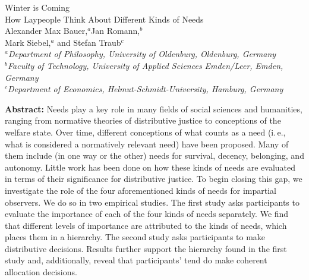 \documentclass[egregdoesnotlikesansseriftitles]{scrartcl}
\begin{document}
\thispagestyle{empty}
\renewcommand{\thefootnote}{\fnsymbol{footnote}}
\begin{center}
   {\LARGE Winter is Coming}\\\vspace{2ex}
   {\Large How Laypeople Think About Different Kinds of Needs}\\\vspace{4ex}
   {\large Alexander Max Bauer,$^{a}$\footnotemark[1] Jan Romann,$^{b}$\\ Mark Siebel,$^a$ and Stefan Traub$^c$}\\\vspace{2ex}
   \textsl{\footnotesize $^{a}$Department of Philosophy, University of Oldenburg, Oldenburg, Germany}\\\vspace{0.5ex}
   \textsl{\footnotesize $^{b}$Faculty of Technology, University of Applied Sciences Emden/Leer, Emden, Germany}\\\vspace{0.5ex}
   \textsl{\footnotesize $^{c}$Department of Economics, Helmut-Schmidt-University, Hamburg, Germany}\\\vspace{2ex}
\end{center}

\vspace{\fill}\noindent\textbf{Abstract:} Needs play a key role in many fields of social sciences and humanities, ranging from normative theories of distributive justice to conceptions of the welfare state.
Over time, different conceptions of what counts as a need (i.\,e., what is considered a normatively relevant need) have been proposed.
Many of them include (in one way or the other) needs for survival, decency, belonging, and autonomy.
Little work has been done on how these kinds of needs are evaluated in terms of their significance for distributive justice.
To begin closing this gap, we investigate the role of the four aforementioned kinds of needs for impartial observers.
We do so in two empirical studies.
The first study asks participants to evaluate the importance of each of the four kinds of needs separately.
We find that different levels of importance are attributed to the kinds of needs, which places them in a hierarchy.
The second study asks participants to make distributive decisions.
Results further support the hierarchy found in the first study and, additionally, reveal that participants' tend do make coherent allocation decisions.\\[0.5ex]
\end{document}
